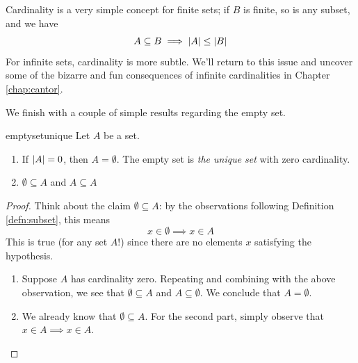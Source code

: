 Cardinality is a very simple concept for finite sets; if $B$ is finite, so is any subset, and we have
\[
	A\subseteq B\implies \left| A\right|\le \left| B\right|
\]
For infinite sets, cardinality is more subtle. We'll return to this issue and uncover some of the bizarre and fun consequences of infinite cardinalities in Chapter \ref{chap:cantor}.
\bigbreak

We finish with a couple of simple results regarding the empty set.

\begin{lemm}{}{emptysetunique}
	Let $A$ be a set.
	\begin{enumerate}
	  \item If $\left| A\right|=0$, then $A=\emptyset$. The empty set is \emph{the unique set} with zero cardinality.
	  \item $\emptyset\subseteq A$ and $A\subseteq A$
	\end{enumerate}
\end{lemm}

\begin{proof}
	Think about the claim $\emptyset\subseteq A$: by the observations following Definition \ref{defn:subset}, this means
	\[
		x\in\emptyset\implies x\in A
	\]
	This is true (for any set $A$!) since there are no elements $x$ satisfying the hypothesis.\footnotemark{}
	\begin{enumerate}
 	 \item Suppose $A$ has cardinality zero. Repeating and combining with the above observation, we see that $\emptyset\subseteq A$ and $A\subseteq\emptyset$. We conclude that $A=\emptyset$.
 	 \item We already know that $\emptyset\subseteq A$. For the second part, simply observe that
 	 $x\in A\implies x\in A$.\qedhere
\end{enumerate}
\end{proof}


